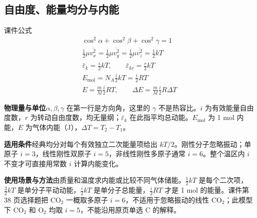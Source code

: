 \documentclass[UTF8,fontset=none,zihao=-4,a4paper]{ctexart}
\newcommand{\explain}[3]{\par\noindent\textbf{物理量与单位}\quad #1\par
\noindent\textbf{适用条件}\quad #2\par
\noindent\textbf{使用场景与方法}\quad #3\par}
\begin{document}
\par\noindent\begin{minipage}{\linewidth}
\subsection{自由度、能量均分与内能}
\begin{infobox}[breakable=false]{课件公式}
\begin{gather*}\cos^2\alpha+\cos^2\beta+\cos^2\gamma=1\\\frac12\mu\overline{v_x^2}=\frac12\mu\overline{v_y^2}=\frac12\mu\overline{v_z^2}=\frac12kT\\\bar\varepsilon_k=\frac i2kT,\qquad\bar\varepsilon_{kr}=\frac r2kT\\E_{\mathrm{mol}}=N_A\frac i2kT=\frac i2RT\\E=\frac mM\frac i2RT,\qquad\Delta E=\frac mM\frac i2R\Delta T\end{gather*}
\end{infobox}
\end{minipage}\par
\explain{$\alpha,\beta,\gamma$ 在第一行是方向角，这里的 $\gamma$ 不是热容比。$i$ 为有效能量自由度数，$r$ 为转动自由度数，均无量纲；$\bar\varepsilon_k$ 在此指平均总动能。$E_{\mathrm{mol}}$ 为 1 mol 内能，$E$ 为气体内能（J），$\Delta T=T_2-T_1$。}{经典均分对每个有效独立二次能量项给出 $kT/2$。刚性分子忽略振动；单原子 $i=3$，线性刚性双原子 $i=5$，非线性刚性多原子通常 $i=6$。整个温区内 $i$ 不变才可直接用常数 $i$ 计算内能变化。}{由质量和温度求内能或比较不同气体储能。$\frac12kT$ 是每个二次项，$\frac32kT$ 是单分子平动动能，$\frac i2kT$ 是单分子总能量，$\frac i2RT$ 才是 1 mol 的能量。课件第 38 页选择题把 CO$_2$ 一概取多原子 $i=6$，不适用于忽略振动的线性 CO$_2$；此模型下 CO$_2$ 和 O$_2$ 均取 $i=5$，不能沿用原页单选 C 的解释。}
\end{document}
